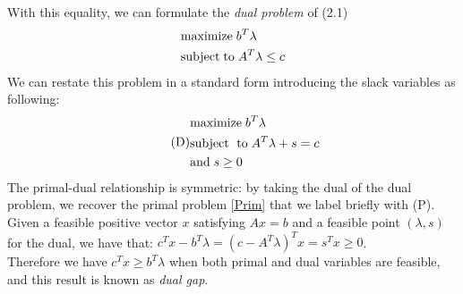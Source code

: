 \documentclass[a4paper,10 pt,titlepage,twoside]{book}
\theoremstyle{plain}
\theoremstyle{definition}
\theoremstyle{remark}
\begin{document}
With this equality, we can formulate the \textit{dual problem} of (2.1)
\begin{equation}
\begin{split}
&\text{maximize\;} b^{T}\lambda\\
&\text{subject\;to\;}A^{T}\lambda \leq c
\end{split}
\end{equation} 
We can restate this problem in a standard form introducing the slack variables as following:
\begin{equation}\tag{D}
\begin{split}
&\text{maximize\;}b^{T}\lambda\\
&\text{subject\; to\;}A^{T}\lambda+s=c\\ &\text{and\;} s\geq0
\end{split}
\end{equation}
The primal-dual relationship is symmetric: by taking the dual of the dual problem, we recover the primal problem \ref{Prim} that we label briefly with (P).\\
Given a feasible positive vector $x$ satisfying $Ax=b$ and a feasible point $\left(\lambda,s\right)$ for the dual, we have that: $c^{T}x-b^{T}\lambda=\left(c-A^{T}\lambda\right)^{T}x=s^{T}x \geq0$.\\
Therefore we have $c^{T}x\geq b^{T}\lambda$ when both primal and dual variables are feasible, and this result is known as \textit{dual gap}.\\
\end{document}
